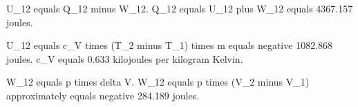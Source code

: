 U_12 equals Q_12 minus W_12.  
Q_12 equals U_12 plus W_12 equals 4367.157 joules.  

U_12 equals c_V times (T_2 minus T_1) times m equals negative 1082.868 joules.  
c_V equals 0.633 kilojoules per kilogram Kelvin.  

W_12 equals p times delta V.  
W_12 equals p times (V_2 minus V_1) approximately equals negative 284.189 joules.